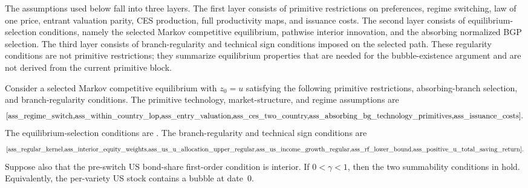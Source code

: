 \documentclass{article}
\begin{document}
The assumptions used below fall into three layers. The first layer consists of primitive restrictions on preferences, regime switching, law of one price, entrant valuation parity, CES production, full productivity maps, and issuance costs. The second layer consists of equilibrium-selection conditions, namely the selected Markov competitive equilibrium, pathwise interior innovation, and the absorbing normalized BGP selection. The third layer consists of branch-regularity and technical sign conditions imposed on the selected path. These regularity conditions are not primitive restrictions; they summarize equilibrium properties that are needed for the bubble-existence argument and are not derived from the current primitive block.

\begin{thm}\label{thm_prod_sufficient}

Consider a selected Markov competitive equilibrium with $z_0=u$ satisfying the following primitive restrictions, absorbing-branch selection, and branch-regularity conditions. The primitive technology, market-structure, and regime assumptions are
\[
\Cref{ass_regime_switch,ass_within_country_lop,ass_entry_valuation,ass_ces_two_country,ass_absorbing_bg_technology_primitives,ass_issuance_costs}.
\]
The equilibrium-selection conditions are . The branch-regularity and technical sign conditions are
\[
\Cref{ass_regular_kernel,ass_interior_equity_weights,ass_us_u_allocation_upper_regular,ass_us_income_growth_regular,ass_rf_lower_bound,ass_positive_u_total_saving_return}.
\]
Suppose also that the pre-switch US bond-share first-order condition is interior. If $0<\gamma<1$, then the two summability conditions in  hold. Equivalently, the per-variety US stock contains a bubble at date~0.
\end{thm}
\end{document}
